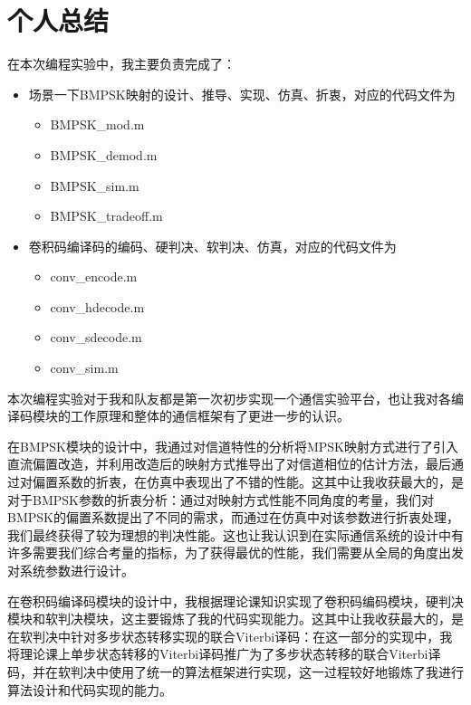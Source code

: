 \part{个人总结}

在本次编程实验中，我主要负责完成了：

\begin{itemize}
    \item 场景一下BMPSK映射的设计、推导、实现、仿真、折衷，对应的代码文件为
    \begin{itemize}
        \item BMPSK\_mod.m
        \item BMPSK\_demod.m
        \item BMPSK\_sim.m
        \item BMPSK\_tradeoff.m
    \end{itemize}
    \item 卷积码编译码的编码、硬判决、软判决、仿真，对应的代码文件为
    \begin{itemize}
        \item conv\_encode.m
        \item conv\_hdecode.m
        \item conv\_sdecode.m
        \item conv\_sim.m
    \end{itemize}
\end{itemize}

本次编程实验对于我和队友都是第一次初步实现一个通信实验平台，也让我对各编译码模块的工作原理和整体的通信框架有了更进一步的认识。

在BMPSK模块的设计中，我通过对信道特性的分析将MPSK映射方式进行了引入直流偏置改造，并利用改造后的映射方式推导出了对信道相位的估计方法，最后通过对偏置系数的折衷，在仿真中表现出了不错的性能。这其中让我收获最大的，是对于BMPSK参数的折衷分析：通过对映射方式性能不同角度的考量，我们对BMPSK的偏置系数提出了不同的需求，而通过在仿真中对该参数进行折衷处理，我们最终获得了较为理想的判决性能。这也让我认识到在实际通信系统的设计中有许多需要我们综合考量的指标，为了获得最优的性能，我们需要从全局的角度出发对系统参数进行设计。

在卷积码编译码模块的设计中，我根据理论课知识实现了卷积码编码模块，硬判决模块和软判决模块，这主要锻炼了我的代码实现能力。这其中让我收获最大的，是在软判决中针对多步状态转移实现的联合Viterbi译码：在这一部分的实现中，我将理论课上单步状态转移的Viterbi译码推广为了多步状态转移的联合Viterbi译码，并在软判决中使用了统一的算法框架进行实现，这一过程较好地锻炼了我进行算法设计和代码实现的能力。
